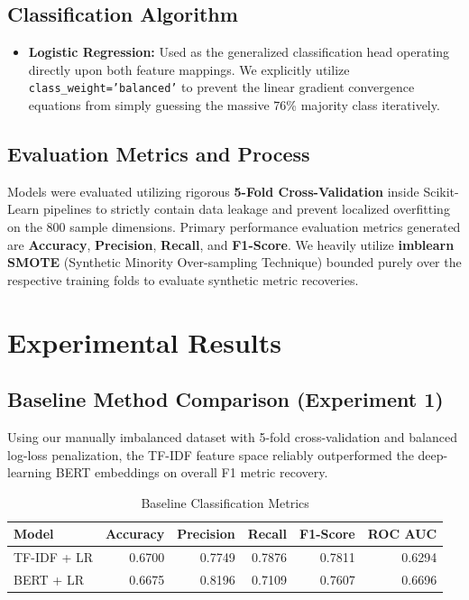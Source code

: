 \documentclass[12pt, a4paper]{article}
\begin{document}
\subsection{Classification Algorithm}
\begin{itemize}
    \item \textbf{Logistic Regression:} Used as the generalized classification head operating directly upon both feature mappings. We explicitly utilize \texttt{class\_weight='balanced'} to prevent the linear gradient convergence equations from simply guessing the massive 76\% majority class iteratively.
\end{itemize}

\subsection{Evaluation Metrics and Process}
Models were evaluated utilizing rigorous \textbf{5-Fold Cross-Validation} inside Scikit-Learn pipelines to strictly contain data leakage and prevent localized overfitting on the 800 sample dimensions. Primary performance evaluation metrics generated are \textbf{Accuracy}, \textbf{Precision}, \textbf{Recall}, and \textbf{F1-Score}. We heavily utilize \textbf{imblearn SMOTE} (Synthetic Minority Over-sampling Technique) bounded purely over the respective training folds to evaluate synthetic metric recoveries. 

\section{Experimental Results}

\subsection{Baseline Method Comparison (Experiment 1)}
Using our manually imbalanced dataset with 5-fold cross-validation and balanced log-loss penalization, the TF-IDF feature space reliably outperformed the deep-learning BERT embeddings on overall F1 metric recovery.

\begin{table}[h]
\centering
\caption{Baseline Classification Metrics}
\label{tab:baseline}
\begin{tabular}{lrrrrr}
\hline
Model & Accuracy & Precision & Recall & F1-Score & ROC AUC \\
\hline
TF-IDF + LR & 0.6700 & 0.7749 & 0.7876 & 0.7811 & 0.6294 \\
BERT + LR & 0.6675 & 0.8196 & 0.7109 & 0.7607 & 0.6696 \\
\hline
\end{tabular}
\end{table}
\end{document}
